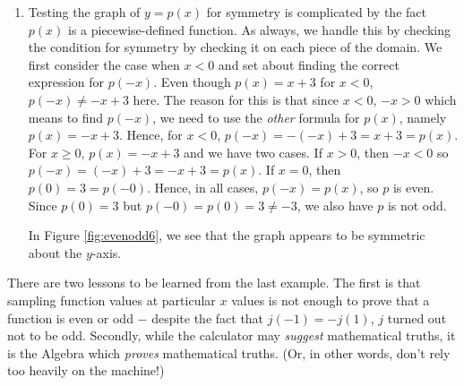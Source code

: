 {\begin{enumerate}
The expression $-j(x)$ doesn't seem to match $j(-x)$ either.  Testing $x = 2$ gives $j(2) = \frac{149}{50}$ and $j(-2) = \frac{151}{50}$, so $j$ is not odd, either. 


Notice in Figure \ref{fig:evenodd5} that the computer plot seems to suggests that the graph of $j$ is symmetric about the $y$-axis which would imply that $j$ is even. However, we have proven that is not the case.  The problem is that the effect of the $x/100$ term is so small, our eyes don't detect it in the graph.


\item Testing the graph of $y=p(x)$ for symmetry is complicated by the fact $p(x)$ is a piecewise-defined function.  As always, we handle this by checking the condition for symmetry by checking it on each piece of the domain.  We first consider the case when $x < 0$ and set about finding the correct expression for $p(-x)$.  Even though $p(x) = x+3$ for $x < 0$, $p(-x) \neq -x + 3$ here. The reason for this is that since $x < 0$, $-x > 0$ which means to find $p(-x)$, we need to use the \textit{other} formula for $p(x)$, namely $p(x) = -x+3$. Hence, for $x < 0$, $p(-x) = -(-x)+3 = x+3 = p(x)$.   For $x \geq 0$, $p(x) = -x+3$ and we have two cases.  If $x > 0$, then $-x < 0$ so $p(-x) = (-x)+3 = -x+3 = p(x)$.  If $x = 0$, then $p(0) = 3 = p(-0)$.  Hence, in all cases, $p(-x) = p(x)$, so $p$ is even. Since $p(0) = 3$ but $p(-0) = p(0) = 3 \neq -3$, we also have $p$ is not odd.  

 
In Figure \ref{fig:evenodd6}, we see that the graph appears to be symmetric about the $y$-axis. 

\end{enumerate}
}

\medskip

There are two lessons to be learned from the last example.  The first is that sampling function values at particular $x$ values is not enough to prove that a function is even or odd $-$ despite the fact that $j(-1) = - j(1)$, $j$ turned out not to be odd.  Secondly, while the calculator may \emph{suggest} mathematical truths, it is the Algebra which \emph{proves} mathematical truths. (Or, in other words, don't rely too heavily on the machine!)

